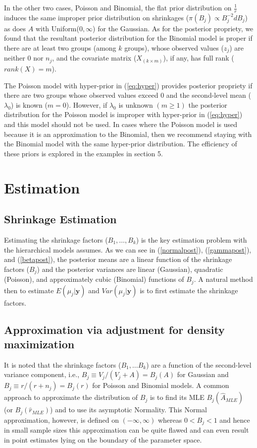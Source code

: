 \documentclass[article]{jss}
\begin{document}
In the other two cases, Poisson and Binomial, the flat prior distribution on $\frac{1}{r}$ induces the same improper prior distribution on shrinkages ($\pi(B_{j})\propto B_{j}^{-2} d B_j$) as does $A$ with Uniform($0, \infty$) for the Gaussian. As for the posterior propriety, we found that the resultant posterior distribution for the Binomial model is proper if there are at least two groups (among $k$ groups), whose observed values ($z_{j}$) are neither 0 nor $n_j$,  and the covariate matrix ($X_{(k\times m )}$), if any,  has full rank ($rank(X)=m$). 


The Poisson model with hyper-prior in (\ref{eq:hyper}) provides posterior propriety if there are two groups whose observed values exceed 0 and the second-level mean ($\lambda_0$) is known ($m=0$). However, if $\lambda_0$ is unknown $(m \geq 1)$ the posterior distribution for the Poisson model is improper with hyper-prior in (\ref{eq:hyper}) and this model should not be used. In cases where the Poisson model is used because it is an approximation to the Binomial, then we recommend staying with the Binomial model with the same hyper-prior distribution. The efficiency of these priors is explored in the examples in section 5.



\section[Estimation]{Estimation}

\subsection[Shrinkage estimation]{Shrinkage Estimation}
Estimating the shrinkage factors ($B_1, \ldots, B_k$) is the key estimation problem with the hierarchical models  assumes. As we can see in (\ref{normalpost}), (\ref{gammapost}), and (\ref{betapost}), the posterior means are a linear function of the shrinkage factors ($B_{j}$) and the posterior variances are linear (Gaussian), quadratic (Poisson), and  approximately cubic (Binomial) functions of $B_{j}$. A natural method then to estimate $E(\mu_{j}\vert \textbf{y})$ and $Var(\mu_{j}\vert \textbf{y})$ is to first estimate the shrinkage factors.

\subsection[ADM]{Approximation via adjustment for density maximization}\label{ADM}
It is noted that the shrinkage factors ($B_1, \ldots B_k$) are a function of the second-level variance component, i.e., $B_{j}\equiv V_{j}/(V_{j}+A)=B_{j}(A)$ for Gaussian and $B_{j}\equiv r/(r+n_{j})=B_{j}(r)$ for Poisson and Binomial models. A common approach to approximate the distribution of $B_{j}$ is to find its MLE $B_{j}(\hat{A}_{MLE})$ (or  $B_{j}(\hat{r}_{MLE})$) and to use its asymptotic Normality. This Normal approximation, however, is defined on $(-\infty, \infty)$ whereas $0 < B_{j} < 1$ and hence in small sample sizes this approximation can be quite flawed and can even result in point estimates lying on the boundary of the parameter space.
\end{document}
